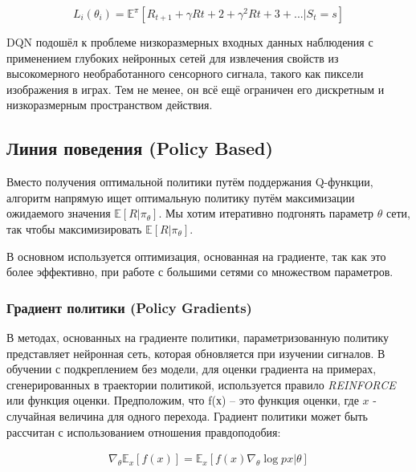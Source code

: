 \begin{equation} \label{eq:someEq}
L_i(\theta_i) = \mathbb{E}^\pi [R_{t+1} + \gamma R{t+2} + \gamma^2 R{t+3} + ... |S_t = s]
\end{equation}


DQN подошёл к проблеме низкоразмерных входных данных наблюдения с применением глубоких нейронных сетей для извлечения свойств из высокомерного необработанного сенсорного сигнала, такого как пиксели изображения в играх. Тем не менее, он всё ещё ограничен его дискретным и низкоразмерным пространством действия.

\subsection{Линия поведения (Policy Based)}

Вместо получения оптимальной политики путём поддержания Q-функции, алгоритм напрямую ищет оптимальную политику путём максимизации ожидаемого значения $\mathbb{E}[R|\pi_\theta]$. Мы хотим итеративно подгонять параметр $\theta$ сети, так чтобы максимизировать $\mathbb{E}[R|\pi_\theta]$.

В основном используется оптимизация, основанная на градиенте, так как это более эффективно, при работе с большими сетями со множеством параметров. \cite{Arulkumaran_2017}

\subsubsection{Градиент политики (Policy Gradients)}

В методах, основанных на градиенте политики, параметризованную политику представляет нейронная сеть, которая обновляется при изучении сигналов. В обучении с подкреплением без модели, для оценки градиента на примерах, сгенерированных в траектории политикой, используется правило {\itshape REINFORCE} или функция оценки. Предположим, что f(х) – это функция оценки, где $x$ - случайная величина для одного перехода. Градиент политики может быть рассчитан с использованием отношения правдоподобия:

\begin{equation}
	\label{eq:ch1-likelihood-ratios}
	\begin{multlined}
		\nabla_\theta \mathbb{E}_x[f(x)] = \mathbb{E}_x[f(x) \nabla_\theta \log p x|\theta]
	\end{multlined}
\end{equation}

